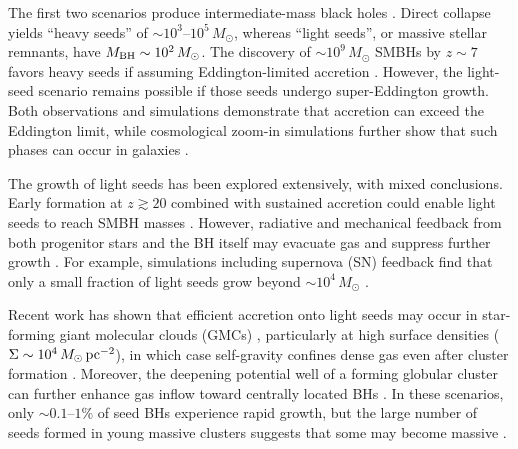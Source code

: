 \documentclass[twocolumn]{aastex631}
\begin{document}
The first two scenarios produce intermediate-mass black holes \citep[IMBHs;][]{GreeneStraderHo_2020ARA&A..58..257G}. Direct collapse yields ``heavy seeds'' of $\sim 10^3$--$10^5\,M_\odot$, whereas ``light seeds'', or  massive stellar remnants, have $M_{\rm BH}\sim 10^2\,M_\odot$. The discovery of $\sim 10^9\,M_\odot$ SMBHs by $z\sim 7$ favors heavy seeds if assuming Eddington-limited accretion \citep[i.e., $\dot M_{\rm BH} \lesssim M_{\rm BH}/t_{\rm Sal}$, where $t_{\rm Sal}\equiv 0.1 \kappa_{\rm es}c/(4\pi G) \sim 45\,\rm Myr$;][]{WangYangFan_2021ApJ...907L...1W}. However, the light-seed scenario remains possible if those seeds undergo super-Eddington growth. Both observations \citep[e.g.,][]{SuhScharwachterFarina_2025NatAs...9..271S} and simulations \citep{JiangStoneDavis_2014ApJ...796..106J,JiangStoneDavis_2019ApJ...880...67J} demonstrate that accretion can exceed the Eddington limit, while cosmological zoom-in simulations further show that such phases can occur in galaxies \citep{HopkinsGrudicSu_2024OJAp....7E..18H,HopkinsSquireSu_2024OJAp....7E..19H,HopkinsSuMurray_2025OJAp....8E..48H}. 

The growth of light seeds has been explored extensively, with mixed conclusions. Early formation at $z\gtrsim 20$ combined with sustained accretion could enable light seeds to reach SMBH masses \citep{TanakaHaiman_2009ApJ...696.1798T,MadauHaardtDotti_2014ApJ...784L..38M}. However, radiative and mechanical feedback from both progenitor stars and the BH itself may evacuate gas and suppress further growth \citep{JohnsonBromm_2007MNRAS.374.1557J,AlvarezWiseAbel_2009ApJ...701L.133A}. For example, simulations including supernova (SN) feedback find that only a small fraction of light seeds grow beyond $\sim 10^4\,M_\odot$ \citep{MehtaReganProle_2024OJAp....7E.107M}.

Recent work has shown that efficient accretion onto light seeds may occur in star-forming giant molecular clouds (GMCs) \citep{ShiKremerGrudic_2023MNRAS.518.3606S,ShiKremerHopkins_2024A&A...691A..24S}, particularly at high surface densities ($\Sigma \sim 10^4\,M_\odot\,\rm pc^{-2}$), in which case self-gravity confines dense gas even after cluster formation \citep{GrudicHopkinsFaucher-Giguere_2018MNRAS.475.3511G}. Moreover, the deepening potential well of a forming globular cluster can further enhance gas inflow toward centrally located BHs \citep{ShiKremerHopkins_2024ApJ...969L..31S}. In these scenarios, only $\sim 0.1$--$1\%$ of seed BHs experience rapid growth, but the large number of seeds formed in young massive clusters suggests that some may become massive \citep{ReganVolonteri_2024OJAp....7E..72R}.
\end{document}
